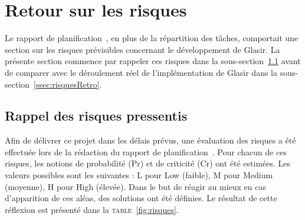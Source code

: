\section{Retour sur les risques}
\label{sec:risques}

Le rapport de planification~\cite{planif}, en plus de la répartition des tâches, comportait une section sur les risques prévisibles concernant le développement de Glasir. La présente section commence par rappeler ces risques dans la {\sc sous-section}~\ref{ssec:risquesBase} avant de comparer avec le déroulement réel de l'implémentation de Glasir dans la {\sc sous-section}~\ref{ssec:risquesRetro}.

\subsection{Rappel des risques pressentis}
\label{ssec:risquesBase}

Afin de délivrer ce projet dans les délais prévus, une évaluation des risques a été effectuée lors de la rédaction du rapport de planification~\cite{planif}. Pour chacun de ces risques, les notions de probabilité (Pr) et de criticité (Cr) ont été estimées. Les valeurs possibles sont les suivantes : L pour \og Low \fg{} (faible), M pour \og Medium \fg{} (moyenne), H pour \og High \fg{} (élevée). Dans le but de réagir au mieux en cas d’apparition de ces aléas, des solutions ont été définies. Le résultat de cette réflexion est présenté dans la \textsc{table}~\ref{fig:risques}. 

